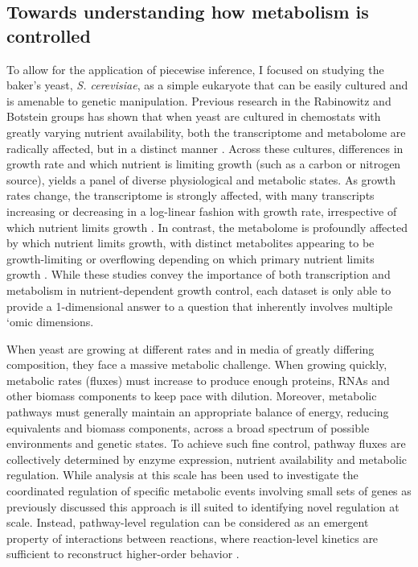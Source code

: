\subsection{Towards understanding how metabolism is controlled}

To allow for the application of piecewise inference, I focused on studying the baker's yeast, \textit{S. cerevisiae}, as a simple eukaryote that can be easily cultured and is amenable to genetic manipulation. Previous research in the Rabinowitz and Botstein groups has shown that when yeast are cultured in chemostats with greatly varying nutrient availability, both the transcriptome and metabolome are radically affected, but in a distinct manner \cite{Brauer:2008jn, Boer:2010fb}. Across these cultures, differences in growth rate and which nutrient is limiting growth (such as a carbon or nitrogen source), yields a panel of diverse physiological and metabolic states. As growth rates change, the transcriptome is strongly affected, with many transcripts increasing or decreasing in a log-linear fashion with growth rate, irrespective of which nutrient limits growth \cite{Brauer:2008jn}. In contrast, the metabolome is profoundly affected by which nutrient limits growth, with distinct metabolites appearing to be growth-limiting or overflowing depending on which primary nutrient limits growth \cite{Boer:2010fb}. While these studies convey the importance of both transcription and metabolism in nutrient-dependent growth control, each dataset is only able to provide a 1-dimensional answer to a question that inherently involves multiple `omic dimensions.

When yeast are growing at different rates and in media of greatly differing composition, they face a massive metabolic challenge. When growing quickly, metabolic rates (fluxes) must increase to produce enough  proteins, RNAs and other biomass components to keep pace with dilution.  Moreover, metabolic pathways must generally maintain an appropriate balance of energy, reducing equivalents and biomass components, across a broad spectrum of possible environments and genetic states. To achieve such fine control, pathway fluxes are collectively determined by enzyme expression, nutrient availability and metabolic regulation.  While analysis at this scale has been used to investigate the coordinated regulation of specific metabolic events involving small sets of genes \cite{Zampar:2013fr, Link:2013dj} as previously discussed this approach is ill suited to identifying novel regulation at scale. Instead, pathway-level regulation can be considered as an emergent property of interactions between reactions, where reaction-level kinetics are sufficient to reconstruct higher-order behavior \cite{Fell:1997wg}.

